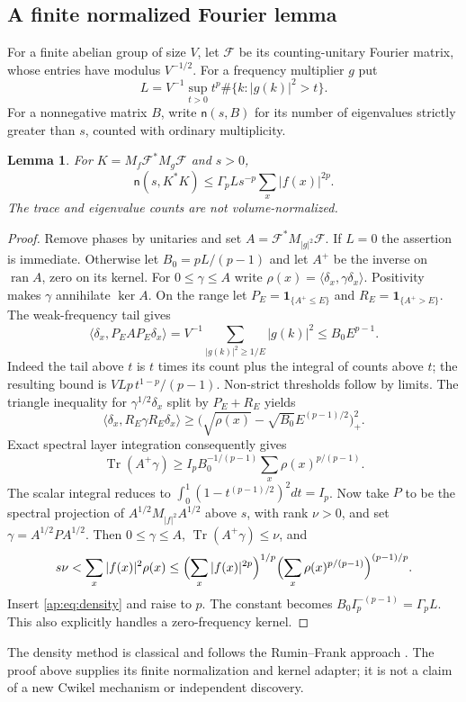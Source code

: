 \documentclass[11pt]{article}
\newtheorem{lemma}[theorem]{Lemma}
\newcommand{\Tr}{\operatorname{Tr}}
\newcommand{\nct}{\mathsf n}
\begin{document}
\subsection{A finite normalized Fourier lemma}
For a finite abelian group of size $V$, let $\mathcal F$ be its counting-unitary Fourier
matrix, whose entries have modulus $V^{-1/2}$. For a frequency multiplier $g$ put
\[
 L=V^{-1}\sup_{t>0}t^p\#\{k:|g(k)|^2>t\}.
\]
For a nonnegative matrix $B$, write $\nct(s,B)$ for its number of eigenvalues strictly
greater than $s$, counted with ordinary multiplicity.
\begin{lemma}\label{ap:lem:finite}
For $K=M_f\mathcal F^*M_g\mathcal F$ and $s>0$,
\[
 \nct(s,K^*K)\leq\Gamma_p Ls^{-p}\sum_x|f(x)|^{2p}.
\]
The trace and eigenvalue counts are not volume-normalized.
\end{lemma}
\begin{proof}
Remove phases by unitaries and set $A=\mathcal F^*M_{|g|^2}\mathcal F$.
If $L=0$ the assertion is immediate. Otherwise let $B_0=pL/(p-1)$ and let $A^+$
be the inverse on $\operatorname{ran}A$, zero on its kernel. For $0\leq\gamma\leq A$
write $\rho(x)=\langle\delta_x,\gamma\delta_x\rangle$. Positivity makes $\gamma$
annihilate $\ker A$. On the range let $P_E=\mathbf1_{\{A^+\leq E\}}$ and
$R_E=\mathbf1_{\{A^+>E\}}$. The weak-frequency tail gives
\[
 \langle\delta_x,P_EAP_E\delta_x\rangle
 =V^{-1}\sum_{|g(k)|^2\geq1/E}|g(k)|^2\leq B_0E^{p-1}.
\]
Indeed the tail above $t$ is $t$ times its count plus the integral of counts above $t$;
the resulting bound is $VLp\,t^{1-p}/(p-1)$. Non-strict thresholds follow by limits.
The triangle inequality for $\gamma^{1/2}\delta_x$ split by $P_E+R_E$ yields
\[
 \langle\delta_x,R_E\gamma R_E\delta_x\rangle
 \geq\bigl(\sqrt{\rho(x)}-\sqrt{B_0}E^{(p-1)/2}\bigr)_+^2.
\]
Exact spectral layer integration consequently gives
\begin{equation}\label{ap:eq:density}
 \Tr(A^+\gamma)\geq I_pB_0^{-1/(p-1)}\sum_x\rho(x)^{p/(p-1)}.
\end{equation}
The scalar integral reduces to
$\int_0^1(1-t^{(p-1)/2})^2dt=I_p$.
Now take $P$ to be the spectral projection of $A^{1/2}M_{|f|^2}A^{1/2}$ above $s$,
with rank $\nu>0$, and set $\gamma=A^{1/2}PA^{1/2}$. Then
$0\leq\gamma\leq A$, $\Tr(A^+\gamma)\leq\nu$, and
\[
 s\nu<\sum_x|f(x)|^2\rho(x)
 \leq\Bigl(\sum_x|f(x)|^{2p}\Bigr)^{1/p}
       \Bigl(\sum_x\rho(x)^{p/(p-1)}\Bigr)^{(p-1)/p}.
\]
Insert \eqref{ap:eq:density} and raise to $p$. The constant becomes
$B_0I_p^{-(p-1)}=\Gamma_pL$. This also explicitly handles a zero-frequency kernel.
\end{proof}
The density method is classical and follows the Rumin--Frank approach
\cite[Section 2]{ap:frank}. The proof above supplies its finite normalization and kernel
adapter; it is not a claim of a new Cwikel mechanism or independent discovery.
\end{document}
